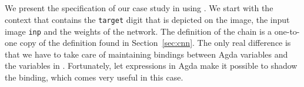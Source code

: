 {\begin{code}[hide]%
%
\>[2]\AgdaSpace{}%
\AgdaSymbol{:}\AgdaSpace{}%
\<%
\\
%
\>[2]\<%
\\
\>[2][@{}l@{\AgdaIndent{0}}]%
\>[4]\AgdaSymbol{=}%
\>[3249I]\AgdaSpace{}%
\<%
\\
\>[3249I][@{}l@{\AgdaIndent{0}}]%
\>[13]\AgdaOperator{\AgdaFunction{++}}\AgdaSpace{}%
\AgdaSpace{}%
\AgdaOperator{\AgdaFunction{++}}\AgdaSpace{}%
\AgdaSpace{}%
\AgdaSpace{}%
\AgdaSymbol{(}\AgdaSpace{}%
\AgdaSpace{}%
\AgdaSymbol{(}\AgdaSymbol{))}\<%
\\
\>[0]\<%
\end{code}

We present the specification of our case study in  using .  We start
with the context  that contains the \texttt{target} digit that
is depicted on the image, the input image \texttt{inp} and the weights of the network.
The definition of the chain is a one-to-one copy of the definition found in
Section~\ref{sec:cnn}.  The only real difference is that we have to take care of
maintaining bindings between Agda variables and the variables in .  Fortunately,
let expressions in Agda make it possible to shadow the binding, which comes very
useful in this case.

}
